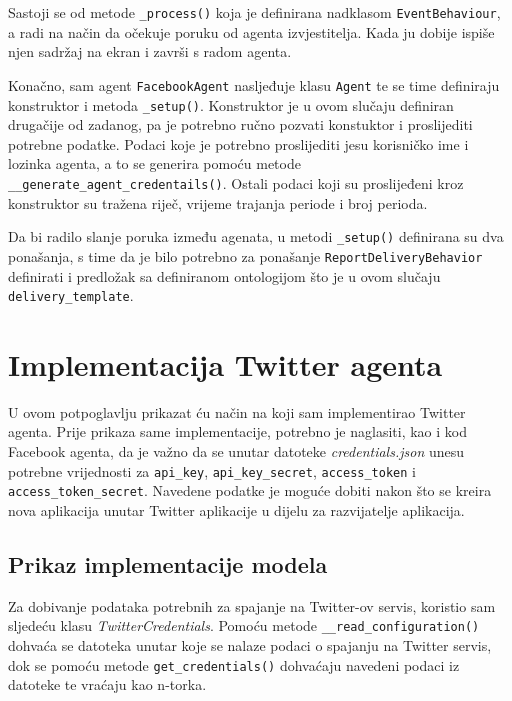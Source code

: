 \documentclass[a4paper,12pt]{foi}
\begin{document}
Sastoji se od metode \texttt{\_process()} koja je definirana nadklasom \texttt{EventBehaviour}, a radi na način da očekuje poruku od agenta izvjestitelja. Kada ju dobije ispiše njen sadržaj na ekran i završi s radom agenta.

Konačno, sam agent \texttt{FacebookAgent} nasljeđuje klasu \texttt{Agent} te se time definiraju konstruktor i metoda \texttt{\_setup()}. Konstruktor je u ovom slučaju definiran drugačije od zadanog, pa je potrebno ručno pozvati konstuktor i proslijediti potrebne podatke. Podaci koje je potrebno proslijediti jesu korisničko ime i lozinka agenta, a to se generira pomoću metode \texttt{\_\_generate\_agent\_credentails()}. Ostali podaci koji su proslijeđeni kroz konstruktor su tražena riječ, vrijeme trajanja periode i broj perioda.

Da bi radilo slanje poruka između agenata, u metodi \texttt{\_setup()} definirana su dva ponašanja,  s time da je bilo potrebno za ponašanje \texttt{ReportDeliveryBehavior} definirati i predložak sa definiranom ontologijom što je u ovom slučaju \texttt{delivery\_template}.

\section{Implementacija Twitter agenta}

U ovom potpoglavlju prikazat ću način na koji sam implementirao Twitter agenta. Prije prikaza same implementacije, potrebno je naglasiti, kao i kod Facebook agenta, da je važno da se unutar datoteke \textit{credentials.json} unesu potrebne vrijednosti za \texttt{api\_key}, \texttt{api\_key\_secret}, \texttt{access\_token} i \texttt{access\_token\_secret}. Navedene podatke je moguće dobiti nakon što se kreira nova aplikacija unutar Twitter aplikacije u dijelu za razvijatelje aplikacija.

\subsection{Prikaz implementacije modela}

Za dobivanje podataka potrebnih za spajanje na Twitter-ov servis, koristio sam sljedeću klasu \textit{TwitterCredentials}. Pomoću metode \texttt{\_\_read\_configuration()} dohvaća se datoteka unutar koje se nalaze podaci o spajanju na Twitter servis, dok se pomoću metode \texttt{get\_credentials()} dohvaćaju navedeni podaci iz datoteke te vraćaju kao n-torka.

\lstset{commentstyle=\textit,language=python}

\end{document}
